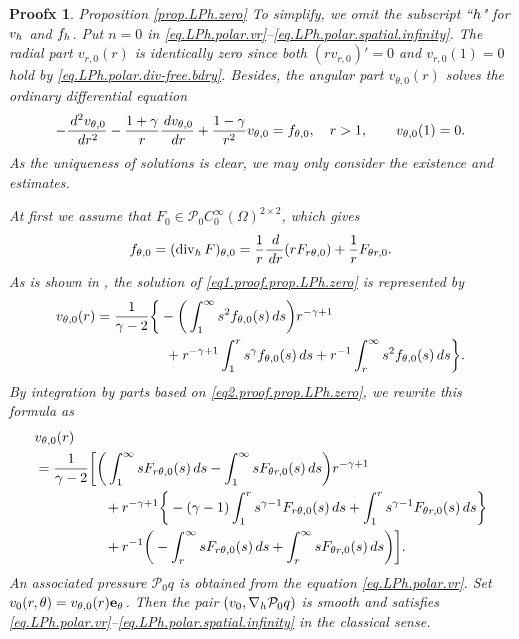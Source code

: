\documentclass[10pt,a4paper]{amsart}
\newtheorem{proofx}{Proofx}
\newcommand{\dd}{\,{\rm d}}
\newcommand{\h}{{\rm h}}
\newcommand{\opdiv}{\operatorname{div}}
\begin{document}
\begin{proofx}{Proposition \ref{prop.LPh.zero}}
To simplify, we omit the subscript ``$\h$" for $v_\h$ and $f_\h$. Put $n=0$ in \eqref{eq.LPh.polar.vr}--\eqref{eq.LPh.polar.spatial.infinity}. The radial part $v_{r,0}(r)$ is identically zero since both $(r v_{r,0})'=0$ and $v_{r,0}(1)=0$ hold by \eqref{eq.LPh.polar.div-free.bdry}. Besides, the angular part $v_{\theta,0}(r)$ solves the ordinary differential equation 
%
\begin{align}\label{eq1.proof.prop.LPh.zero}
-\frac{\dd^2 v_{\theta,0}}{\dd r^2} 
-\frac{1+\gamma}r \frac{\dd v_{\theta,0}}{\dd r}  
+\frac{1-\gamma}{r^2} v_{\theta,0}
= f_{\theta,0}, \quad r>1, 
\qquad 
v_{\theta,0}(1)=0. 
\end{align}
%
As the uniqueness of solutions is clear, we may only consider the existence and estimates. 


At first we assume that $F_0\in {\mathcal P}_0 C^\infty_0(\Omega)^{2\times2}$, which gives 
%
\begin{align}\label{eq2.proof.prop.LPh.zero}
f_{\theta,0}
= (\opdiv_\h F)_{\theta,0}
= \frac{1}{r} \frac{\dd}{\dd r} (r F_{r \theta,0}) 
+ \frac{1}{r} F_{\theta r,0}. 
\end{align}
%
As is shown in \cite[Proof of Proposition 3.1]{Higaki2023}, the solution of \eqref{eq1.proof.prop.LPh.zero} is represented by 
%
\begin{equation*}
\begin{split}
v_{\theta,0}(r)
&= 
\frac{1}{\gamma-2}
\bigg\{	
-\bigg(
\int_{1}^{\infty} s^2 f_{\theta,0}(s)\dd s 
\bigg) 
r^{-\gamma+1} \\
&\qquad\qquad\quad
+ r^{-\gamma+1} \int_{1}^{r} s^{\gamma} f_{\theta,0}(s)\dd s 
+ r^{-1} \int_{r}^{\infty} s^2 f_{\theta,0}(s)\dd s
\bigg\}. 
\end{split}
\end{equation*}
%
By integration by parts based on \eqref{eq2.proof.prop.LPh.zero}, we rewrite this formula as 
%
\begin{equation}\label{rep1.proof.prop.LPh.zero}
\begin{split}
&v_{\theta,0}(r) \\
&=\frac{1}{\gamma-2}
\bigg[
\bigg(
\int_{1}^{\infty} s F_{r \theta,0}(s) \dd s 
- \int_{1}^{\infty} s F_{\theta r,0}(s) \dd s 
\bigg) 
r^{-\gamma+1} \\
&\qquad\qquad\quad
+ r^{-\gamma+1}
\bigg\{
-(\gamma-1) \int_{1}^{r} s^{\gamma-1} F_{r \theta,0}(s) \dd s 
+ \int_{1}^{r} s^{\gamma-1} F_{\theta r,0}(s) \dd s 
\bigg\} \\
&\qquad\qquad\quad
+ r^{-1} 
\bigg(
-\int_{r}^{\infty} s F_{r \theta,0}(s) \dd s 
+ \int_{r}^{\infty} s F_{\theta r,0}(s) \dd s 
\bigg)
\bigg]. 
\end{split}
\end{equation}
%
An associated pressure ${\mathcal P}_0 q$ is obtained from the equation \eqref{eq.LPh.polar.vr}. Set $v_0(r,\theta)=v_{\theta,0}(r) {\bf e}_\theta$. Then the pair $(v_0, \nabla_\h{\mathcal P}_0 q)$ is smooth and satisfies \eqref{eq.LPh.polar.vr}--\eqref{eq.LPh.polar.spatial.infinity} in the classical sense. 



\end{proofx}
\end{document}
